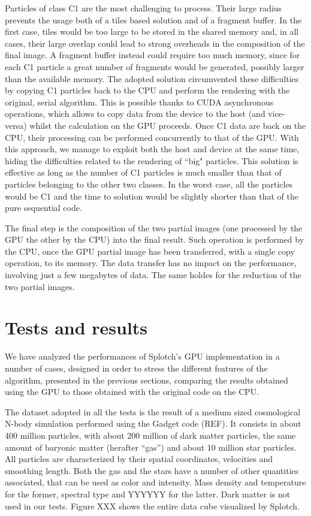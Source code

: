\documentclass[11pt]{article}
\begin{document}
Particles of class C1 are the most challenging to process. Their large 
radius prevents the usage both of a tiles based solution and of a fragment buffer.
In the first case, tiles would be too large to be stored in the shared memory
and, in all cases, their large overlap could lead to strong overheads in the composition of the 
final image. A fragment buffer instead could require too much memory, since 
for each C1 particle a great number of fragments would be generated, possibly
larger than the available memory. The adopted solution circumvented these 
difficulties by copying C1 particles back to the CPU and perform the rendering 
with the original, serial algorithm. This is possible thanks to CUDA asynchronous
operations, which allows to copy data from the device to the host (and vice-versa)
whilst the calculation on the GPU proceeds. Once C1 data are back on the CPU, 
their processing can be performed concurrently to that of the GPU.  
With this approach, we manage to exploit both the host and device
at the same time, hiding the difficulties related to the rendering of ``big"
particles. This solution is effective as long as the number of C1 particles 
is much smaller than that of particles belonging to the other two classes. 
In the worst case, all the particles would be C1 and the time to solution would be slightly 
shorter than that of the pure sequential code. 

The final step is the composition of the two partial images (one processed by the
GPU the other by the CPU) into the final result. 
Such operation is performed by the CPU, 
once the GPU partial image has been transferred, with a single copy operation, to
its memory. The data transfer has no impact on the performance, involving just a few 
megabytes of data. The same holdes for the reduction of the two partial images.   

\section{Tests and results}

We have analyzed the performances of Splotch's GPU implementation in a number of cases, designed in 
order to stress the different features of the algorithm, presented in the previous 
sections, comparing the results 
obtained using the GPU to those obtained with the original code on the CPU. 

The dataset adopted in all the tests is the result of a medium sized cosmological 
N-body simulation performed using the Gadget code (REF). It consists in about 
400 million particles, with about 200 million of dark matter particles, the same amount 
of baryonic matter (herafter ``gas'') and about 10 million star particles. 
All particles are characterized by their spatial coordinates, velocities
and smoothing length. 
Both the gas and the stars have a number of other quantities associated, that can be used 
as color and intensity. Mass density and temperature for the former, spectral type and YYYYYY
for the latter. Dark matter is not used in our tests. Figure XXX shows 
the entire data cube visualized by Splotch.
\end{document}

